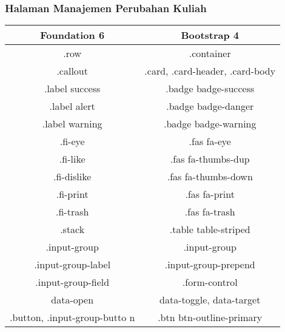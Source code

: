 \subsubsection{Halaman Manajemen Perubahan Kuliah}
\begin{tabular}{||c|c||} 
	\hline
	\textbf{Foundation 6} & \textbf{Bootstrap 4}  \\ [0.5ex] 
	\hline\hline
	.row &   .container\\ 
	\hline	
	.callout &  .card, .card-header, .card-body \\
	\hline		
	.label success &  .badge badge-success \\
	\hline	
	.label alert & .badge badge-danger  \\
	\hline	
	.label warning & .badge badge-warning  \\
	\hline	
	.fi-eye &  .fas fa-eye \\
	\hline	
	.fi-like &  .fas fa-thumbs-dup \\	
	\hline	
	.fi-dislike &  .fas fa-thumbs-down \\
	\hline	
	.fi-print &  .fas fa-print \\
	\hline	
	.fi-trash &  .fas fa-trash \\
	\hline	
	.stack & .table table-striped  \\
	\hline	
	.input-group & .input-group  \\ 
	\hline	
	.input-group-label & .input-group-prepend  \\ 
	\hline	
	.input-group-field & .form-control \\ 
	\hline	
	data-open & data-toggle, data-target \\
	\hline	
	.button, .input-group-butto n& .btn btn-outline-primary  \\ [1ex] 
	\hline
\end{tabular}

